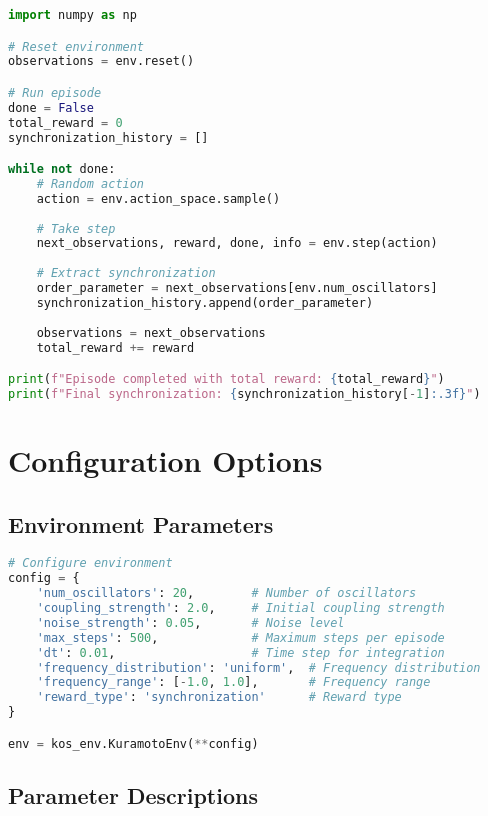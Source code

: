 \begin{lstlisting}[language=python, caption=Simple Episode]
import numpy as np

# Reset environment
observations = env.reset()

# Run episode
done = False
total_reward = 0
synchronization_history = []

while not done:
    # Random action
    action = env.action_space.sample()
    
    # Take step
    next_observations, reward, done, info = env.step(action)
    
    # Extract synchronization
    order_parameter = next_observations[env.num_oscillators]
    synchronization_history.append(order_parameter)
    
    observations = next_observations
    total_reward += reward

print(f"Episode completed with total reward: {total_reward}")
print(f"Final synchronization: {synchronization_history[-1]:.3f}")
\end{lstlisting}

\section{Configuration Options}

\subsection{Environment Parameters}

\begin{lstlisting}[language=python, caption=Environment Configuration]
# Configure environment
config = {
    'num_oscillators': 20,        # Number of oscillators
    'coupling_strength': 2.0,     # Initial coupling strength
    'noise_strength': 0.05,       # Noise level
    'max_steps': 500,             # Maximum steps per episode
    'dt': 0.01,                   # Time step for integration
    'frequency_distribution': 'uniform',  # Frequency distribution
    'frequency_range': [-1.0, 1.0],       # Frequency range
    'reward_type': 'synchronization'      # Reward type
}

env = kos_env.KuramotoEnv(**config)
\end{lstlisting}

\subsection{Parameter Descriptions}

